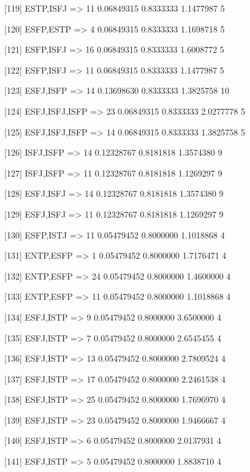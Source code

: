 [119] {ESTP,ISFJ}           => {11} 0.06849315 0.8333333  1.1477987  5   

[120] {ESFP,ESTP}           => {4}  0.06849315 0.8333333  1.1698718  5   

[121] {ESFP,ISFJ}           => {16} 0.06849315 0.8333333  1.6008772  5   

[122] {ESFP,ISFJ}           => {11} 0.06849315 0.8333333  1.1477987  5   

[123] {ESFJ,ISFP}           => {14} 0.13698630 0.8333333  1.3825758 10   

[124] {ESFJ,ISFJ,ISFP}      => {23} 0.06849315 0.8333333  2.0277778  5   

[125] {ESFJ,ISFJ,ISFP}      => {14} 0.06849315 0.8333333  1.3825758  5   

[126] {ISFJ,ISFP}           => {14} 0.12328767 0.8181818  1.3574380  9   

[127] {ISFJ,ISFP}           => {11} 0.12328767 0.8181818  1.1269297  9   

[128] {ESFJ,ISFJ}           => {14} 0.12328767 0.8181818  1.3574380  9   

[129] {ESFJ,ISFJ}           => {11} 0.12328767 0.8181818  1.1269297  9   

[130] {ESFP,ISTJ}           => {11} 0.05479452 0.8000000  1.1018868  4   

[131] {ENTP,ESFP}           => {1}  0.05479452 0.8000000  1.7176471  4   

[132] {ENTP,ESFP}           => {24} 0.05479452 0.8000000  1.4600000  4   

[133] {ENTP,ESFP}           => {11} 0.05479452 0.8000000  1.1018868  4   

[134] {ESFJ,ISTP}           => {9}  0.05479452 0.8000000  3.6500000  4   

[135] {ESFJ,ISTP}           => {7}  0.05479452 0.8000000  2.6545455  4   

[136] {ESFJ,ISTP}           => {13} 0.05479452 0.8000000  2.7809524  4   

[137] {ESFJ,ISTP}           => {17} 0.05479452 0.8000000  2.2461538  4   

[138] {ESFJ,ISTP}           => {25} 0.05479452 0.8000000  1.7696970  4   

[139] {ESFJ,ISTP}           => {23} 0.05479452 0.8000000  1.9466667  4   

[140] {ESFJ,ISTP}           => {6}  0.05479452 0.8000000  2.0137931  4   

[141] {ESFJ,ISTP}           => {5}  0.05479452 0.8000000  1.8838710  4   

